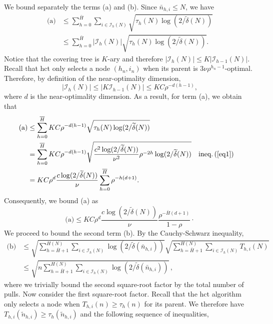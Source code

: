 \endgroup
We bound separately the terms (a) and (b). Since $\bar{n}_{h,i}\leq N$, we have
\begin{align*} %
    \text{(a)} &\leq \sum_{h=0}^{\bar{H}}\sum_{i\in\mathcal{I}_h(N)} \sqrt{\tau_h(N)\log(2/\tilde{\delta}(N))}\\
    &\leq \sum_{h=0}^{\bar{H}}|\mathcal{I}_h(N)| \sqrt{\tau_h(N)\log(2/\tilde{\delta}(N))}.
\end{align*}
Notice that the covering tree is $K$-ary and therefore $|\mathcal{I}_h(N)| \leq K|\mathcal{I}_{h-1}(N)|$. Recall that \gls{hct} only selects a node $(h_n,i_n)$ when its parent is $3\nu\rho^{h_n-1}$-optimal. Therefore, by definition of the near-optimality dimension,
\begin{equation*} %
|\mathcal{I}_h(N)| \leq| K\mathcal{I}_{h-1}(N)| \leq KC\rho^{-d(h-1)},
\end{equation*}
where $d$ is the near-optimality dimension. As a result, for term (a), we obtain that
\begingroup
\allowdisplaybreaks
\begin{align*}
    \text{(a)} & \leq \sum_{h=0}^{\bar{H}} KC\rho^{-d(h-1)} \sqrt{\tau_h(N)\log(2/\tilde{\delta}(N))} \\
               & = \sum_{h=0}^{\bar{H}} KC\rho^{-d(h-1)} \sqrt{\frac{c^2\log(2/\tilde{\delta}(N))}{\nu^2}\rho^{-2h}\log(2/\tilde{\delta}(N))} && \text{ineq.\,(\ref{eq1})} \\
               & = KC\rho^d \frac{c\log(2/\tilde{\delta}(N))}{\nu} \sum_{h=0}^{\bar{H}} \rho^{-h(d+1)}.
\end{align*}
\endgroup
Consequently, we  bound (a) as
\begin{equation} \label{eq17}
    \text{(a)} \leq KC\rho^d \frac{c\log\left(2/\tilde{\delta}(N)\right)}{\nu} \frac{\rho^{-\bar{H}(d+1)}}{1-\rho}\cdot
\end{equation}
We proceed to bound the second term (b). By the Cauchy-Schwarz inequality,
\begin{align*} %
    \text{(b)} &\leq \sqrt{\sum_{h=\bar{H}+1}^{H(N)}\sum_{i\in\mathcal{I}_h(N)} \log\left(2/\tilde{\delta}\left(\bar{n}_{h,i}\right)\right)} \sqrt{\sum_{h=\bar{H}+1}^{H(N)}\sum_{i\in\mathcal{I}_h(N)} T_{h,i}(N)}\\
    &\leq \sqrt{n\sum_{h=\bar{H}+1}^{H(N)}\sum_{i\in\mathcal{I}_h(N)} \log\left(2/\tilde{\delta}\left(\bar{n}_{h,i}\right)\right)}\,,
\end{align*}
where we trivially bound the second square-root factor by the total number of pulls. Now consider the first square-root factor. Recall that the \gls{hct} algorithm only selects a node when $T_{h,i}(n)\geq\tau_h(n)$ for its parent. We therefore have $T_{h,i}(\tilde{n}_{h,i})\geq\tau_h(\tilde{n}_{h,i})$ and the following sequence of inequalities,
